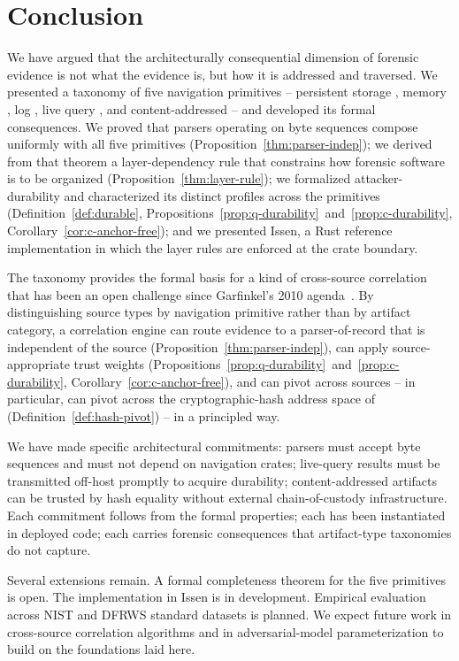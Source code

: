 \section{Conclusion}
\label{sec:conclusion}

We have argued that the architecturally consequential dimension of forensic
evidence is not what the evidence is, but how it is addressed and
traversed. We presented a taxonomy of five navigation primitives --
persistent storage , memory , log , live query
, and content-addressed  -- and developed its formal
consequences. We proved that parsers operating on byte sequences compose
uniformly with all five primitives (Proposition~\ref{thm:parser-indep}); we
derived from that theorem a layer-dependency rule that constrains how
forensic software is to be organized (Proposition~\ref{thm:layer-rule}); we
formalized attacker-durability and characterized its distinct profiles
across the primitives (Definition~\ref{def:durable},
Propositions~\ref{prop:q-durability}~and~\ref{prop:c-durability},
Corollary~\ref{cor:c-anchor-free}); and we presented Issen, a Rust
reference implementation in which the layer rules are enforced at the
crate boundary.

The taxonomy provides the formal basis for a kind of cross-source
correlation that has been an open challenge since Garfinkel's 2010
agenda~\cite{garfinkel2010digital}. By distinguishing source types by
navigation primitive rather than by artifact category, a correlation
engine can route evidence to a parser-of-record that is independent of
the source (Proposition~\ref{thm:parser-indep}), can apply source-appropriate
trust weights (Propositions~\ref{prop:q-durability}~and~\ref{prop:c-durability},
Corollary~\ref{cor:c-anchor-free}), and can pivot across sources -- in
particular, can pivot across the cryptographic-hash address space of
 (Definition~\ref{def:hash-pivot}) -- in a principled way.

We have made specific architectural commitments: parsers must accept
byte sequences and must not depend on navigation crates; live-query results
must be transmitted off-host promptly to acquire durability; content-addressed
artifacts can be trusted by hash equality without external chain-of-custody
infrastructure. Each commitment follows from the formal properties; each
has been instantiated in deployed code; each carries forensic
consequences that artifact-type taxonomies do not capture.

Several extensions remain. A formal completeness theorem for the five
primitives is open. The  implementation in Issen is in development.
Empirical evaluation across NIST and DFRWS standard datasets is planned.
We expect future work in cross-source correlation algorithms and in
adversarial-model parameterization to build on the foundations laid here.

